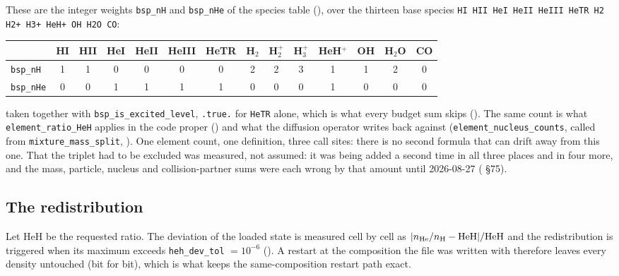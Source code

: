 \documentclass[english,a4paper]{my_memo}
\begin{document}
These are the integer weights \verb|bsp_nH| and \verb|bsp_nHe| of the
species table (), over the
thirteen base species
\verb|HI HII HeI HeII HeIII HeTR H2 H2+ H3+ HeH+ OH H2O CO|:
%
\begin{center}\small
\begin{tabular}{@{}lccccccccccccc@{}}
\toprule
 & HI & HII & HeI & HeII & HeIII & HeTR & H$_2$ & H$_2^+$ & H$_3^+$
 & HeH$^+$ & OH & H$_2$O & CO \\
\midrule
\verb|bsp_nH|  & 1 & 1 & 0 & 0 & 0 & 0 & 2 & 2 & 3 & 1 & 1 & 2 & 0 \\
\verb|bsp_nHe| & 0 & 0 & 1 & 1 & 1 & 1 & 0 & 0 & 0 & 1 & 0 & 0 & 0 \\
\bottomrule
\end{tabular}
\end{center}
%
taken together with \verb|bsp_is_excited_level|, \verb|.true.| for
\verb|HeTR| alone, which is what every budget sum skips
(). The same count is what
\verb|element_ratio_HeH| applies in the code proper
() and what the
diffusion operator writes back against
(\verb|element_nucleus_counts|, called from \verb|mixture_mass_split|,
). One
element count, one definition, three call sites: there is no second
formula that can drift away from this one. That the triplet had to be
excluded was measured, not assumed: it was being added a second time in all
three places and in four more, and the mass, particle, nucleus and
collision-partner sums were each wrong by that amount until 2026-08-27
( \S75).

\subsection{The redistribution}

Let $\mathrm{HeH}$ be the requested ratio. The deviation of the loaded state
is measured cell by cell as $|n_{\rm He}/n_{\rm H} - \mathrm{HeH}|/
\mathrm{HeH}$ and the redistribution is triggered when its maximum exceeds
\verb|heh_dev_tol| $=10^{-6}$ (). A restart at the
composition the file was written with therefore leaves every density
untouched (bit for bit), which is what keeps the same-composition
restart path exact.
\end{document}
